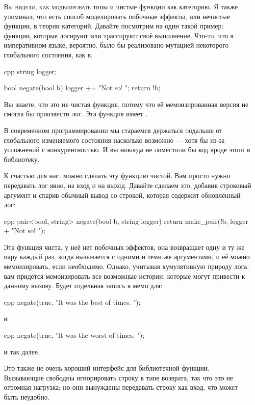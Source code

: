 
\lettrine[lhang=0.17]{В}{ы видели, как моделировать} типы и чистые функции как категорию. Я также
упоминал, что есть способ моделировать побочные эффекты, или нечистые
функции, в теории категорий. Давайте посмотрим на один такой пример:
функции, которые логируют или трассируют своё выполнение. Что-то, что в
императивном языке, вероятно, было бы реализовано мутацией некоторого глобального
состояния, как в:

\begin{snip}{cpp}
string logger;

bool negate(bool b) {
    logger += "Not so! ";
    return !b;
}
\end{snip}
Вы знаете, что это не чистая функция, потому что её мемоизированная версия
не смогла бы произвести лог. Эта функция имеет .

В современном программировании мы стараемся держаться подальше от глобального изменяемого состояния насколько
возможно --- хотя бы из-за усложнений с
конкурентностью. И вы никогда не поместили бы код вроде этого в библиотеку.

К счастью для нас, можно сделать эту функцию чистой. Вам просто
нужно передавать лог явно, на вход и на выход. Давайте сделаем это, добавив
строковый аргумент и спарив обычный вывод со строкой, которая содержит
обновлённый лог:

\begin{snip}{cpp}
pair<bool, string> negate(bool b, string logger) {
    return make_pair(!b, logger + "Not so! ");
}
\end{snip}
Эта функция чиста, у неё нет побочных эффектов, она возвращает одну и ту же пару
каждый раз, когда вызывается с одними и теми же аргументами, и её можно мемоизировать,
если необходимо. Однако, учитывая кумулятивную природу лога,
вам придётся мемоизировать все возможные истории, которые могут привести к данному
вызову. Будет отдельная запись в мемо для:

\begin{snip}{cpp}
negate(true, "It was the best of times. ");
\end{snip}
и

\begin{snip}{cpp}
negate(true, "It was the worst of times. ");
\end{snip}
и так далее.

Это также не очень хороший интерфейс для библиотечной функции. Вызывающие
свободны игнорировать строку в типе возврата, так что это не огромная
нагрузка; но они вынуждены передавать строку как вход, что может быть
неудобно.

